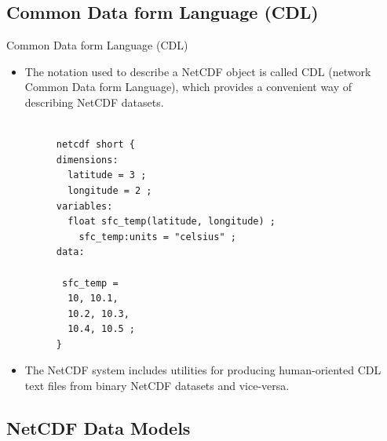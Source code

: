 \documentclass[compress,11pt,xcolor=svgnames,aspectratio=169]{beamer}
\begin{document}
\subsection{Common Data form Language (CDL)}

\begin{frame}[fragile]{Common Data form Language (CDL)}

\begin{itemize}
\setlength\itemsep{0.3cm}

\item The notation used to describe a NetCDF object is called CDL (network Common Data form Language), which provides a convenient way of describing NetCDF datasets.

\begin{figure}
\centering
\begin{varwidth}{\linewidth}
\tiny{

\begin{verbatim}

netcdf short {
dimensions:
  latitude = 3 ;
  longitude = 2 ;
variables:
  float sfc_temp(latitude, longitude) ;
    sfc_temp:units = "celsius" ;
data:

 sfc_temp =
  10, 10.1,
  10.2, 10.3,
  10.4, 10.5 ;
}

\end{verbatim}
}
\end{varwidth}
\end{figure}

\item The NetCDF system includes utilities for producing human-oriented CDL text files from binary NetCDF datasets and vice-versa.

\end{itemize}

\nocite{netcdf}

\end{frame}

\subsection{NetCDF Data Models}
\end{document}
